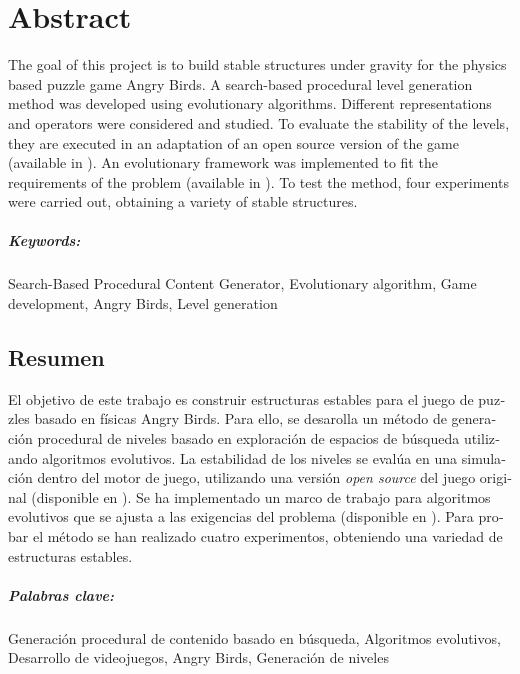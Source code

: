 \begingroup
\let\clearpage\relax
\let\cleardoublepage\relax
\let\cleardoublepage\relax

\chapter*{Abstract}
The goal of this project is to build stable structures under gravity for the physics based puzzle game Angry Birds. A search-based procedural level generation method was developed using evolutionary algorithms. Different representations and operators were considered and studied. To evaluate the stability of the levels, they are executed in an adaptation of an open source version of the game (available in \cite{sciencebirds-adapt}). An evolutionary framework was implemented to fit the requirements of the problem (available in \cite{ab-level}). To test the method, four experiments were carried out, obtaining a variety of stable structures.


\paragraph{Keywords:} Search-Based Procedural Content Generator, Evolutionary algorithm, Game development, Angry Birds, Level generation

\vfill
\begin{otherlanguage}{ngerman}
\chapter*{Resumen}
El objetivo de este trabajo es construir estructuras estables para el juego de puzzles basado en físicas Angry Birds. Para ello, se desarolla un método de generación procedural de niveles basado en exploración de espacios de búsqueda utilizando algoritmos evolutivos. La estabilidad de los niveles se evalúa en una simulación dentro del motor de juego, utilizando una versión \textit{open source} del juego original (disponible en \cite{sciencebirds-adapt}). Se ha implementado un marco de trabajo para algoritmos evolutivos que se ajusta a las exigencias del problema (disponible en \cite{ab-level}). Para probar el método se han realizado cuatro experimentos, obteniendo una variedad de estructuras estables. 

\paragraph{Palabras clave:} Generación procedural de contenido basado en búsqueda, Algoritmos evolutivos, Desarrollo de videojuegos, Angry Birds, Generación de niveles
\end{otherlanguage}

\endgroup

\vfill
